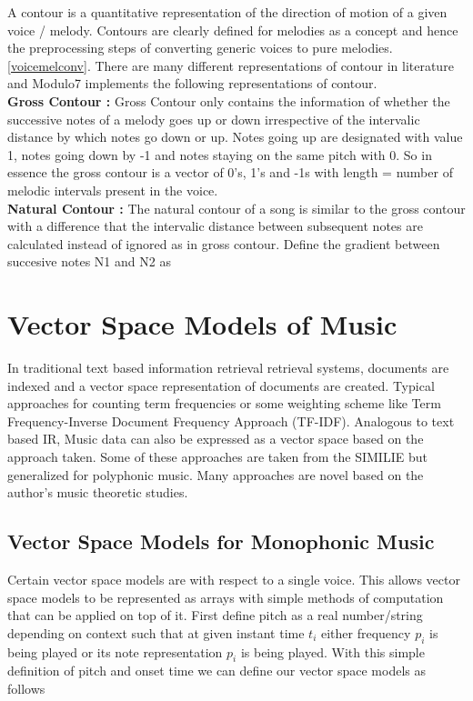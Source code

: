 \noindent A contour is a quantitative representation of the direction of motion of a given voice / melody. Contours are clearly defined for melodies as a concept and hence the preprocessing steps of converting generic voices to pure melodies.\ref{voicemelconv}. There are many different representations of contour in literature and Modulo7 implements the following representations of contour. \\

\noindent \textbf{Gross Contour : } Gross Contour only contains the information of whether the successive notes of a melody goes up or down irrespective of the intervalic distance by which notes go down or up. Notes going up are designated with value 1, notes going down by -1 and notes staying on the same pitch with 0. So in essence the gross contour is a vector of 0's, 1's and -1s with length = number of melodic intervals present in the voice.\\

\noindent \textbf{Natural Contour : } The natural contour of a song is similar to the gross contour with a difference that the intervalic distance between subsequent notes are calculated instead of ignored as in gross contour. Define the gradient between succesive notes N1 and N2 as 


\section{Vector Space Models of Music}

\noindent In traditional text based information retrieval retrieval systems, documents are indexed and a vector space representation of documents are created. Typical approaches for counting term frequencies or some weighting scheme like Term Frequency-Inverse Document Frequency Approach (TF-IDF). Analogous to text based IR, Music data can also be expressed as a vector space based on the approach taken. Some of these approaches are taken from the SIMILIE \cite{similietechnicalmanual} but generalized for polyphonic music. Many approaches are novel based on the author's music theoretic studies. 

\subsection{Vector Space Models for Monophonic Music}

\noindent Certain vector space models are with respect to a single voice. This allows vector space models to be represented as arrays with simple methods of computation that can be applied on top of it. First define pitch as a real number/string depending on context such that at given instant time $t_i$ either frequency $p_i$ is being played or its note representation $p_i$ is being played. With this simple definition of pitch and onset time we can define our vector space models as follows\\
 
